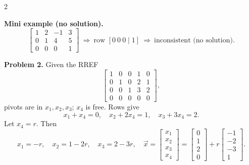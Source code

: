 \documentclass[8pt]{extarticle}
\begin{document}
\begin{multicols}{2}
\begin{tcolorbox}[title={How to Solve $A\vec{x}=\vec{b}$ (Step-by-step)}, colframe=black!60!white, colback=gray!2]
\textbf{Mini example (no solution).}
\[
\left[
\begin{array}{ccc|c}
1&2&-1&3\\
0&1&4&5\\
0&0&0&1
\end{array}
\right]
\ \Rightarrow\ \text{row }[0\ 0\ 0\mid 1]\ \Rightarrow\ \text{inconsistent (no solution)}.
\]
\end{tcolorbox}
\begin{tcolorbox}[title=Problems 2 and 3 — Explanations and Solutions, fontupper=\scriptsize]
\noindent
\textbf{Problem 2.}\; Given the RREF
\[
\begin{bmatrix}
1&0&0&1&0\\
0&1&0&2&1\\
0&0&1&3&2\\
0&0&0&0&0
\end{bmatrix},
\]
pivots are in \(x_1,x_2,x_3\); \(x_4\) is free. Rows give
\[
x_1+x_4=0,\quad x_2+2x_4=1,\quad x_3+3x_4=2.
\]
Let \(x_4=r\). Then
\[
x_1=-r,\quad x_2=1-2r,\quad x_3=2-3r,
\quad
\vec{x}=
\begin{bmatrix}x_1\\x_2\\x_3\\x_4\end{bmatrix}
=
\begin{bmatrix}0\\1\\2\\0\end{bmatrix}
+r
\begin{bmatrix}-1\\-2\\-3\\1\end{bmatrix}.
\]


\end{tcolorbox}
\end{multicols}
\end{document}
